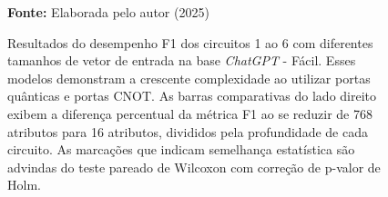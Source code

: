 \begin{figure}
\caption{Resultados do desempenho F1 dos circuitos 1 ao 6 com diferentes tamanhos de vetor de entrada na base \textit{ChatGPT} - Fácil. Esses modelos demonstram a crescente complexidade ao utilizar portas quânticas e portas CNOT. As barras comparativas do lado direito exibem a diferença percentual da métrica F1 ao se reduzir de 768 atributos para 16 atributos, divididos pela profundidade de cada circuito. As marcações que indicam semelhança estatística são advindas do teste pareado de Wilcoxon com correção de p-valor de Holm.}
\label{fig:n_features:easy:g1}
     \centering
    \centering
      \par\medskip\ABNTEXfontereduzida\selectfont\textbf{Fonte:} Elaborada pelo autor (2025) \par\medskip
\end{figure}